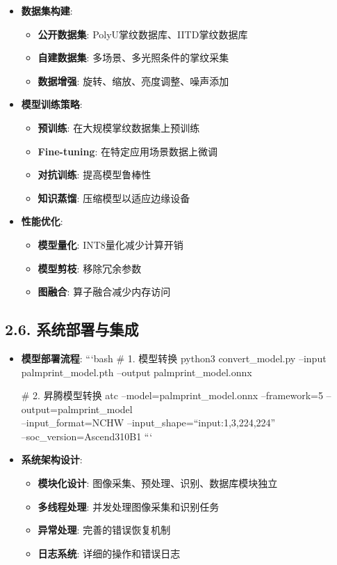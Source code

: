\begin{itemize}
\tightlist
\item
  \textbf{数据集构建}:

  \begin{itemize}
  \tightlist
  \item
    \textbf{公开数据集}: PolyU掌纹数据库、IITD掌纹数据库
  \item
    \textbf{自建数据集}: 多场景、多光照条件的掌纹采集
  \item
    \textbf{数据增强}: 旋转、缩放、亮度调整、噪声添加
  \end{itemize}
\item
  \textbf{模型训练策略}:

  \begin{itemize}
  \tightlist
  \item
    \textbf{预训练}: 在大规模掌纹数据集上预训练
  \item
    \textbf{Fine-tuning}: 在特定应用场景数据上微调
  \item
    \textbf{对抗训练}: 提高模型鲁棒性
  \item
    \textbf{知识蒸馏}: 压缩模型以适应边缘设备
  \end{itemize}
\item
  \textbf{性能优化}:

  \begin{itemize}
  \tightlist
  \item
    \textbf{模型量化}: INT8量化减少计算开销
  \item
    \textbf{模型剪枝}: 移除冗余参数
  \item
    \textbf{图融合}: 算子融合减少内存访问
  \end{itemize}
\end{itemize}

\subsection{2.6.
系统部署与集成}\label{ux7cfbux7edfux90e8ux7f72ux4e0eux96c6ux6210}

\begin{itemize}
\item
  \textbf{模型部署流程}: ```bash \# 1. 模型转换 python3
  convert\_model.py --input palmprint\_model.pth --output
  palmprint\_model.onnx

  \# 2. 昇腾模型转换 atc --model=palmprint\_model.onnx --framework=5
  --output=palmprint\_model\\
  --input\_format=NCHW --input\_shape=``input:1,3,224,224''\\
  --soc\_version=Ascend310B1 ```
\item
  \textbf{系统架构设计}:

  \begin{itemize}
  \tightlist
  \item
    \textbf{模块化设计}: 图像采集、预处理、识别、数据库模块独立
  \item
    \textbf{多线程处理}: 并发处理图像采集和识别任务
  \item
    \textbf{异常处理}: 完善的错误恢复机制
  \item
    \textbf{日志系统}: 详细的操作和错误日志
  \end{itemize}
\end{itemize}

